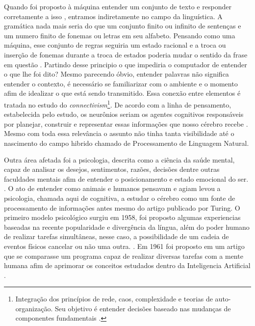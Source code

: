 \documentclass[
	12pt,				%
	openright,			%
	twoside,			%
	a4paper,			%
	english,			%
	french,				%
	spanish,			%
	brazil				%
	]{abntex2}
\begin{document}
Quando foi proposto à máquina entender um conjunto de texto e responder corretamente a isso \cite[146]{turing1950}, entramos indiretamente no campo da linguística. A gramática nada mais seria do que um conjunto finito ou infinito de sentenças e um numero finito de fonemas ou letras em seu alfabeto. Pensando como uma máquina, esse conjunto de regras seguiria um estado racional e a troca ou inserção de fonemas durante a troca de estados poderia mudar o sentido da frase em questão \cite[13-16]{chomsky2002syntactic}. Partindo desse principio o que impediria o computador de entender o que lhe foi dito? Mesmo parecendo óbvio, entender palavras não significa entender o contexto, é necessário se familiarizar com o ambiente e o momento afim de idealizar o que está sendo transmitido. Essa conexão entre elementos é tratada no estudo do \textit{connectivism}\footnote{Integração dos princípios de rede, caos, complexidade e teorias de auto-organização. Seu objetivo é entender decisões baseado nas mudanças de componentes fundamentais \cite[5]{siemens2014connectivism}.}. De acordo com a linha de pensamento, estabelecida pelo estudo, os neurônios seriam os agentes cognitivos responsáveis por planejar, construir e representar essas informações que nosso cérebro recebe \cite[22]{brandura1996}. Mesmo com toda essa relevância o assunto não tinha tanta visibilidade até o nascimento  do campo hibrido chamado de Processamento de Linguagem Natural. \cite[16]{russell2003artificial}

Outra área afetada foi a psicologia, descrita como a ciência da saúde mental, capaz de analisar os desejos, sentimentos, razões, decisões dentre outras faculdades mentais afim de entender o posicionamento e estado emocional do ser. \cite[4-6]{william1890principles}. O ato de entender como animais e humanos pensavam e agiam levou a psicologia, chamada aqui de cognitiva, a estudar o cérebro como um fonte de processamento de informações antes mesmo do artigo publicado por Turing. O primeiro modelo psicológico surgiu em 1958, foi proposto algumas experiencias baseadas na recente popularidade e divergência da língua, além do poder humano de realizar tarefas simultâneas, nesse caso, a possibilidade de um cadeia de eventos físicos cancelar ou não uma outra. \cite[4-7]{broadbent1958perception}. Em 1961 foi proposto em um artigo que se comparasse um programa capaz de realizar diversas tarefas com a mente humana afim de aprimorar os conceitos estudados dentro da Inteligencia Artificial \cite[110]{newell1961gps}.
\end{document}
